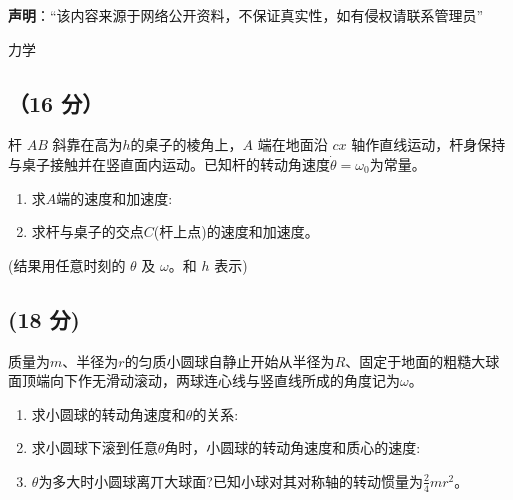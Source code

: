 
\textbf{声明}：“该内容来源于网络公开资料，不保证真实性，如有侵权请联系管理员”

力学
\subsection{（16 分）}
杆 $AB$ 斜靠在高为$h$的桌子的棱角上，$A$ 端在地面沿 $cx$ 轴作直线运动，杆身保持与桌子接触并在竖直面内运动。已知杆的转动角速度$\dot{\theta}=\omega_{0}$为常量。
\begin{enumerate}
\item 求$A$端的速度和加速度:
\item 求杆与桌子的交点$C$(杆上点)的速度和加速度。
\end{enumerate}
(结果用任意时刻的 $\theta$ 及 $\omega$。和 $h$ 表示)
\subsection{(18 分)}
质量为$m$、半径为$r$的匀质小圆球自静止开始从半径为$R$、固定于地面的粗糙大球面顶端向下作无滑动滚动，两球连心线与竖直线所成的角度记为$\omega$。
\begin{enumerate}
\item 求小圆球的转动角速度和$\theta$的关系:
\item 求小圆球下滚到任意$\theta$角时，小圆球的转动角速度和质心的速度:
\item $\theta$为多大时小圆球离丌大球面?已知小球对其对称轴的转动惯量为$\frac{2}{4}mr^2$。
\end{enumerate}
